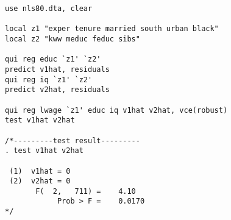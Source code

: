 \begin{lstlisting}
use nls80.dta, clear

local z1 "exper tenure married south urban black"
local z2 "kww meduc feduc sibs"

qui reg educ `z1' `z2'
predict v1hat, residuals
qui reg iq `z1' `z2'
predict v2hat, residuals

qui reg lwage `z1' educ iq v1hat v2hat, vce(robust)
test v1hat v2hat

/*---------test result---------
. test v1hat v2hat

 (1)  v1hat = 0
 (2)  v2hat = 0
       F(  2,   711) =    4.10
            Prob > F =    0.0170
*/
\end{lstlisting}
